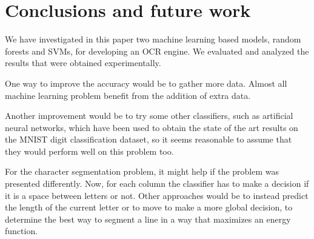\section{Conclusions and future work}
We have investigated in this paper two machine learning based models, random forests and SVMs, for developing an OCR engine. We evaluated and analyzed the results that were obtained experimentally. 

One way to improve the accuracy would be to gather more data. Almost all machine learning problem benefit from the addition of extra data\cite{halevy2009unreasonable}.

Another improvement would be to try some other classifiers, such as artificial neural networks, which have been used to obtain the state of the art results on the MNIST digit classification dataset, so it seems reasonable to assume that they would perform well on this problem too. 

For the character segmentation problem, it might help if the problem was presented differently. Now, for each column the classifier has to make a decision if it is a space between letters or not. Other approaches would be to instead predict the length of the current letter or to move to make a more global decision, to determine the best way to segment a line in a way that maximizes an energy function.